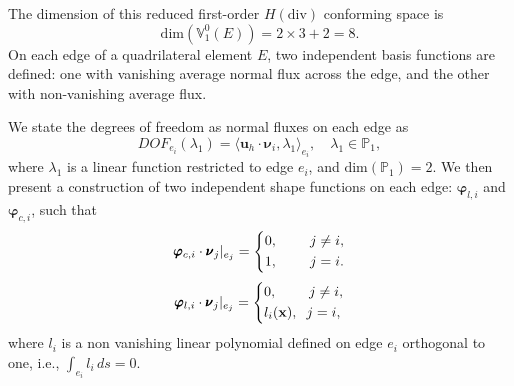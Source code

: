 The dimension of this reduced first-order $H(\text{div})$ conforming space is
\begin{equation}\label{eq:hdivdim}
		  \text{dim}(\mathbb{V}_1^0(E)) = 2\times 3 + 2 = 8.
\end{equation}
On each edge of a quadrilateral element $E$, two independent basis functions are defined: 
one with vanishing average normal flux across the edge, and the other with non-vanishing average flux.

We state the degrees of freedom as normal fluxes on each edge as
\begin{equation}
		  DOF_{e_i}(\lambda_1) = \langle \mathbf{u}_h \cdot \pmb{\nu}_i, \lambda_1 \rangle_{e_i}, \quad \lambda_1 \in \mathbb{P}_1,
\end{equation}
where $\lambda_1$ is a linear function restricted to edge $e_i$, and 
$\text{dim}(\mathbb{P}_1) = 2$.
We then present a construction of two independent shape functions on each edge:
$\pmb{\varphi}_{l,i}$ and $\pmb{\varphi}_{c,i}$, such that
\begin{equation}\label{eq:constbasishdiv_show}
\pmb{\varphi}_{c,i}\cdot \pmb{\nu}_j \rvert_{e_j} = \left \{
		 \begin{aligned}
					&0, \hspace{0.8cm} j \neq i, \\
					&1, \hspace{0.8cm} j=i.
		 \end{aligned}
		 \right.
\end{equation}
\begin{equation}\label{eq:linearbasishdiv_show}
		  \pmb{\varphi}_{l,i}\cdot \pmb{\nu}_j \rvert_{e_j} = \left \{
					\begin{aligned}
							  &0, \hspace{0.8cm} j \neq i, \\
							  &l_i(\mathbf{x}),\hspace{0.2cm} j=i,
					\end{aligned}
					\right.
\end{equation}
where $l_i$ is a non vanishing linear polynomial defined on edge $e_i$ 
orthogonal to one, i.e., $\int_{e_i}l_i\, ds = 0$.

